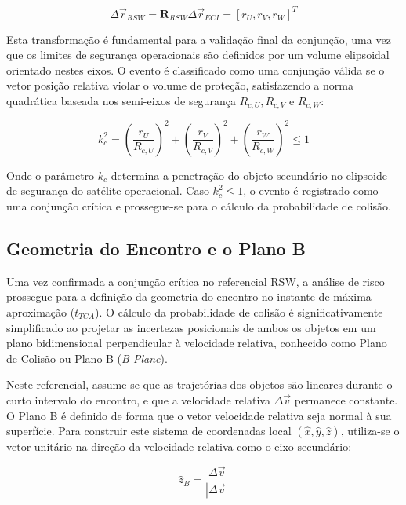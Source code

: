 \begin{equation}
    \Delta \vec{r}_{RSW} = \mathbf{R}_{RSW} \Delta \vec{r}_{ECI} = [r_U, r_V, r_W]^T
\end{equation}



Esta transformação é fundamental para a validação final da conjunção, uma vez que os limites de segurança operacionais são definidos por um volume elipsoidal orientado nestes eixos. O evento é classificado como uma conjunção válida se o vetor posição relativa violar o volume de proteção, satisfazendo a norma quadrática baseada nos semi-eixos de segurança $R_{c,U}, R_{c,V}$ e $R_{c,W}$:

\begin{equation}
    k_c^2 = \left(\frac{r_U}{R_{c,U}}\right)^2 + \left(\frac{r_V}{R_{c,V}}\right)^2 + \left(\frac{r_W}{R_{c,W}}\right)^2 \leq 1
\end{equation}

Onde o parâmetro $k_c$ determina a penetração do objeto secundário no elipsoide de segurança do satélite operacional. Caso $k_c^2 \leq 1$, o evento é registrado como uma conjunção crítica e prossegue-se para o cálculo da probabilidade de colisão.

\subsection{Geometria do Encontro e o Plano B}
\label{subsec:plano_b}

Uma vez confirmada a conjunção crítica no referencial RSW, a análise de risco prossegue para a definição da geometria do encontro no instante de máxima aproximação ($t_{TCA}$). O cálculo da probabilidade de colisão é significativamente simplificado ao projetar as incertezas posicionais de ambos os objetos em um plano bidimensional perpendicular à velocidade relativa, conhecido como Plano de Colisão ou Plano B (\textit{B-Plane}).



Neste referencial, assume-se que as trajetórias dos objetos são lineares durante o curto intervalo do encontro, e que a velocidade relativa $\Delta \vec{v}$ permanece constante. O Plano B é definido de forma que o vetor velocidade relativa seja normal à sua superfície. Para construir este sistema de coordenadas local $(\hat{x}, \hat{y}, \hat{z})$, utiliza-se o vetor unitário na direção da velocidade relativa como o eixo secundário:

\begin{equation}
    \hat{z}_B = \frac{\Delta \vec{v}}{|\Delta \vec{v}|}
\end{equation}

